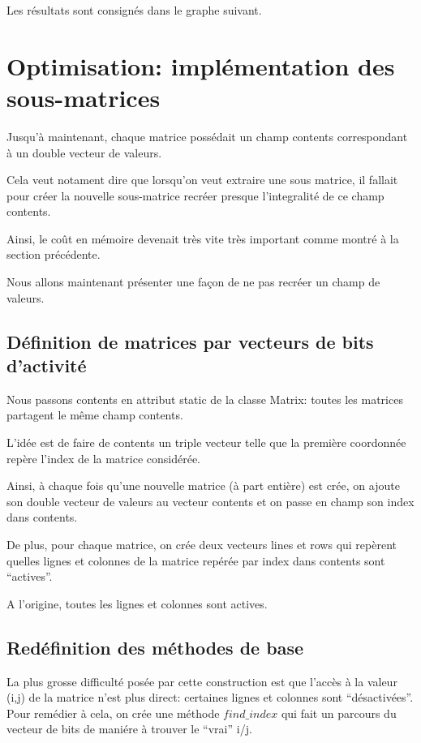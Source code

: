 \documentclass[a4paper,11pt]{article}
\begin{document}
Les résultats sont consignés dans le graphe suivant.

\section{Optimisation: implémentation des sous-matrices}


Jusqu'à maintenant, chaque matrice possédait un champ contents correspondant à un double vecteur de valeurs.

Cela veut notament dire que lorsqu'on veut extraire une sous matrice, il fallait pour créer la nouvelle sous-matrice recréer presque l'integralité de ce champ contents.

Ainsi, le coût en mémoire devenait très vite très important comme montré à la section précédente.

Nous allons maintenant présenter une façon de ne pas recréer un champ de valeurs.

\subsection{Définition de matrices par vecteurs de bits d'activité}

Nous passons contents en attribut static de la classe Matrix: toutes les matrices partagent le même champ contents.

L'idée est de faire de contents un triple vecteur telle que la première coordonnée repère l'index de la matrice considérée. %

Ainsi, à chaque fois qu'une nouvelle matrice (à part entière) est crée, on ajoute son double vecteur de valeurs au vecteur contents et on passe en champ son index dans contents.

De plus, pour chaque matrice, on crée deux vecteurs lines et rows qui repèrent quelles lignes et colonnes de la matrice repérée par index dans contents sont ``actives''.

A l'origine, toutes les lignes et colonnes sont actives.

\subsection{Redéfinition des méthodes de base}

La plus grosse difficulté posée par cette construction est que l'accès à la valeur (i,j) de la matrice n'est plus direct: certaines lignes et colonnes sont ``désactivées''. 
Pour remédier à cela, on crée une méthode $find\_index$ qui fait un parcours du vecteur de bits de maniére à trouver le ``vrai'' i/j.
\end{document}

